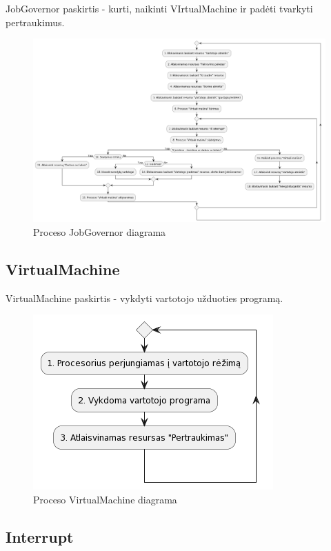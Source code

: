 \documentclass{VUMIFInfKursinis}
\begin{document}
JobGovernor paskirtis - kurti, naikinti VIrtualMachine ir padėti tvarkyti pertraukimus.

\begin{figure}[H]
	\centering	
	\includegraphics[scale=0.3]{img/JobGovernor}
	\caption{Proceso JobGovernor diagrama}   %
	\label{img:JobGovernor}
\end{figure}

\subsection{VirtualMachine}

VirtualMachine paskirtis - vykdyti vartotojo užduoties programą.

\begin{figure}[H]
	\centering	
	\includegraphics[scale=0.65]{img/VirtualMachine}
	\caption{Proceso VirtualMachine diagrama}   %
	\label{img:VirtualMachine}
\end{figure}

\subsection{Interrupt}
\end{document}
